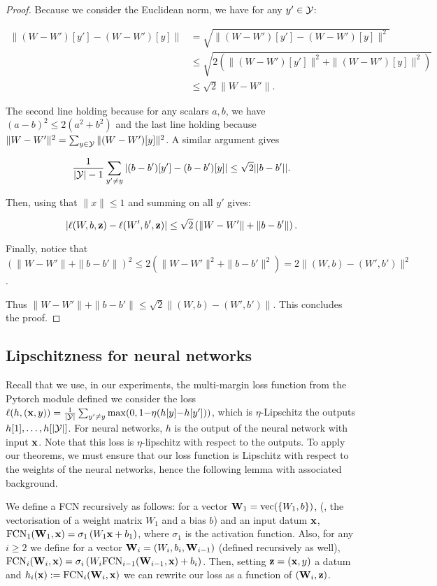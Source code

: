 \begin{noaddcontents}
\begin{proof}
    
       Because we consider the Euclidean norm, we have for any $y'\in\mathcal{Y}$:
    
        \begin{align*}
            \left\| (W-W')[y'] - (W-W')[y]  \right\| & = \sqrt{\| (W-W')[y'] - (W-W')[y]\|^2} \\
            & \leq \sqrt{2 \left(\|(W-W')[y']\|^2 + \|(W-W')[y]\|^2 \right)} \\
            & \leq \sqrt{2}\|W-W'\|.
        \end{align*}
    
        The second line holding because for any scalars $a,b$, we have $(a-b)^2 \leq 2(a^2 + b^2)$ and the last line holding because $\|W-W'\|^2= \sum_{y\in\mathcal{Y}} \|(W-W')[y]\|^2$.
        A similar argument gives
    
        \[\frac{1}{|\mathcal{Y}|-1}\sum_{y^\prime \neq y} |(b-b')[y'] - (b-b')[y]| \leq \sqrt{2}||b-b'||.\]
    
        Then, using that $\|x\| \leq 1$ and summing on all $y'$ gives: 
    
        \[|\ell(W,b,\mathbf{z})- \ell(W',b',\mathbf{z})| \leq \sqrt{2}\left(\|W-W'\| + \|b-b'\|\right). \]
    
        Finally, notice that $(\|W-W'\| + \|b-b'\|)^2 \leq 2(\|W-W'\|^2 + \|b-b'\|^2) = 2\|(W,b)-(W',b')\|^2$. 
    
        Thus $\|W-W'\| + \|b-b'\| \leq \sqrt{2}\|(W,b)-(W',b')\|$. 
        This concludes the proof.
    \end{proof}
    
    \subsection{Lipschitzness for neural networks}
    \label{sec:lip-nn}
    
    Recall that we use, in our experiments, the multi-margin loss function from the Pytorch module defined we consider the loss $\ell(h, (\mathbf{x}, y)) = \frac{1}{|\mathcal{Y}|}\sum_{y'\ne y} \max(0, 1{-} \eta(h[y]{-}h[y']))$, which is $\eta$-Lipschitz \wrt the outputs $h[1],\dots, h[|\mathcal{Y}|]$.
    For neural networks, $h$ is the output of the neural network with input $\mathbf{x}$. Note that this loss is $\eta$-lipschitz with respect to the outputs.
    To apply our theorems, we must ensure that our loss function is Lipschitz with respect to the weights of the neural networks, hence the following lemma with associated background.
    
    We define a FCN recursively as follows: for a vector $\mathbf{W}_1= \operatorname*{\mathrm{vec}}(\{W_1,b\})$, (\ie, the vectorisation of a weight matrix $W_1$ and a bias $b$) and an input datum $\mathbf{x}$, $\text{FCN}_1(\mathbf{W}_1, \mathbf{x})= \sigma_1\left(W_1\mathbf{x} +b_1  \right)$, where $\sigma_1$ is the activation function.
    Also, for any $i\geq 2$ we define for a vector $\mathbf{W}_i= (W_{i},b_i,\mathbf{W}_{i-1})$ (defined recursively as well), $\text{FCN}_i(\mathbf{W}_{i},\mathbf{x})= \sigma_i\left(W_i\text{FCN}_{i-1}(\mathbf{W}_{i-1},\mathbf{x}) +b_i  \right)$.
    Then, setting $\mathbf{z}=(\mathbf{x},y)$ a datum and  $h_i(\mathbf{x}) := \text{FCN}_i(\mathbf{W}_{i},\mathbf{x})$ we can rewrite our loss as a function of $(\mathbf{W}_{i},\mathbf{z})$. 
    

\end{noaddcontents}
